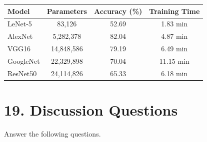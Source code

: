 \documentclass[11pt]{article}
\begin{document}
\begin{center}

\begin{tabular}{|l|c|c|c|}

\hline

Model &
Parameters &
Accuracy (\%) &
Training Time\\

\hline

LeNet-5 & 83,126 & 52.69 & 1.83 min\\

\hline

AlexNet & 5,282,378 & 82.04 & 4.87 min\\

\hline

VGG16 & 14,848,586 & 79.19 & 6.49 min\\

\hline

GoogleNet & 22,329,898 & 70.04 & 11.15 min\\

\hline

ResNet50 & 24,114,826 & 65.33 & 6.18 min\\

\hline

\end{tabular}

\end{center}


\section*{19. Discussion Questions}

Answer the following questions.
\end{document}
